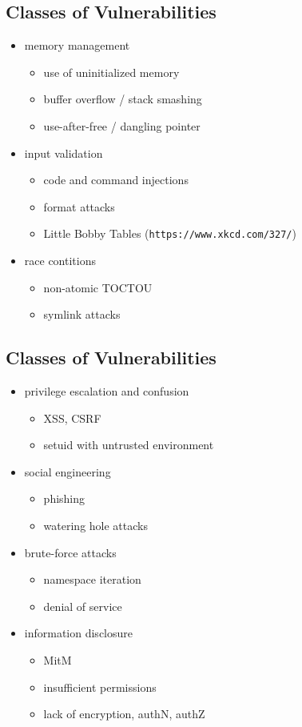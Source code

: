 \documentclass[xga]{xdvislides}
\begin{document}
\subsection{Classes of Vulnerabilities}
\Normalsize
\begin{itemize}
	\item memory management
		\begin{itemize}
			\item use of uninitialized memory
			\item buffer overflow / stack smashing
			\item use-after-free / dangling pointer
		\end{itemize}
	\item input validation
		\begin{itemize}
			\item code and command injections
			\item format attacks
			\item Little Bobby Tables ({\tt https://www.xkcd.com/327/})
		\end{itemize}
	\item race contitions
		\begin{itemize}
			\item non-atomic TOCTOU
			\item symlink attacks
		\end{itemize}
\end{itemize}

\subsection{Classes of Vulnerabilities}
\begin{itemize}
	\item privilege escalation and confusion
		\begin{itemize}
			\item XSS, CSRF
			\item setuid with untrusted environment
		\end{itemize}
	\item social engineering
		\begin{itemize}
			\item phishing
			\item watering hole attacks
		\end{itemize}
	\item brute-force attacks
		\begin{itemize}
			\item namespace iteration
			\item denial of service
		\end{itemize}
	\item information disclosure
		\begin{itemize}
			\item MitM
			\item insufficient permissions
			\item lack of encryption, authN, authZ
		\end{itemize}
\end{itemize}
\end{document}
